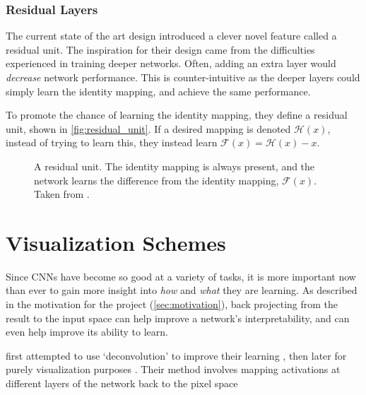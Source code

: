 \subsubsection{Residual Layers}
  The current state of the art design introduced a clever novel feature called
  a residual unit\citep{he_deep_2015,he_identity_2016}. The inspiration for their design came from the difficulties
  experienced in training deeper networks. Often, adding an extra layer would
  \emph{decrease} network performance. This is counter-intuitive as the deeper
  layers could simply learn the identity mapping, and achieve the same
  performance.

  To promote the chance of learning the identity mapping, they define
  a residual unit, shown in \autoref{fig:residual_unit}. If a desired mapping
  is denoted $\mathcal{H}(x)$, instead of trying to learn this, they instead
  learn $\mathcal{F}(x) = \mathcal{H}(x) - x$. 
  \begin{figure}
    \centering
    \caption[The residual unit from ResNet]
          {A residual unit. The identity mapping is always present, and the
            network learns the difference from the identity mapping, $\mathcal{F}(x)$.
            Taken from \citep{he_deep_2015}.}
      \label{fig:residual_unit}
  \end{figure}

\section{Visualization Schemes}\label{sec:visualization_schemes}
  Since CNNs have become so good at a variety of tasks, it is more important
  now than ever to gain more insight into \emph{how} and \emph{what} they are
  learning. As described in the motivation for the project
  (\autoref{sec:motivation}), back projecting from the result to the input space
  can help improve a network's interpretability, and can even help improve its
  ability to learn. 

  \citeauthor{zeiler_adaptive_2011} first attempted to use `deconvolution' to
  improve their learning \citep{zeiler_adaptive_2011}, then later for purely
  visualization purposes \citep{zeiler_visualizing_2014}. Their method
  involves mapping activations at different layers of the network back to the pixel
  space
  
